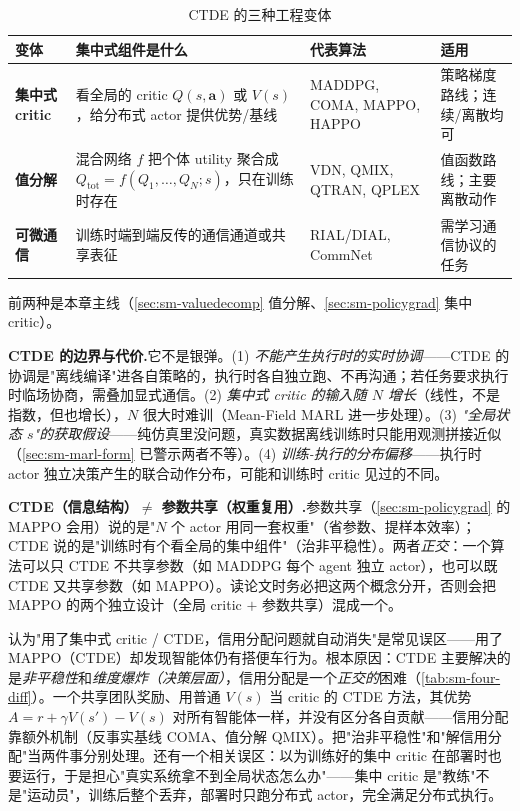 \begin{table}[H]\centering\small
\caption{CTDE 的三种工程变体}
\label{tab:sm-ctde-variants}
\begin{tabular}{p{} p{} p{} p{}}
\toprule
变体 & 集中式组件是什么 & 代表算法 & 适用 \\
\midrule
\textbf{集中式 critic} & 看全局的 critic $Q(s,\mathbf{a})$ 或 $V(s)$，给分布式 actor 提供优势/基线 & MADDPG, COMA, MAPPO, HAPPO & 策略梯度路线；连续/离散均可 \\
\textbf{值分解} & 混合网络 $f$ 把个体 utility 聚合成 $Q_{\text{tot}}=f(Q_1,\dots,Q_N;s)$，只在训练时存在 & VDN, QMIX, QTRAN, QPLEX & 值函数路线；主要离散动作 \\
\textbf{可微通信} & 训练时端到端反传的通信通道或共享表征 & RIAL/DIAL, CommNet & 需学习通信协议的任务 \\
\bottomrule
\end{tabular}
\end{table}

前两种是本章主线（\cref{sec:sm-valuedecomp} 值分解、\cref{sec:sm-policygrad} 集中 critic）。

\begin{note}
\textbf{CTDE 的边界与代价.}\;它不是银弹。(1) \emph{不能产生执行时的实时协调}——CTDE 的协调是"离线编译"进各自策略的，执行时各自独立跑、不再沟通；若任务要求执行时临场协商，需叠加显式通信。(2) \emph{集中式 critic 的输入随 $N$ 增长}（线性，不是指数，但也增长），$N$ 很大时难训（Mean-Field MARL 进一步处理）。(3) \emph{"全局状态 $s$"的获取假设}——纯仿真里没问题，真实数据离线训练时只能用观测拼接近似（\cref{sec:sm-marl-form} 已警示两者不等）。(4) \emph{训练-执行的分布偏移}——执行时 actor 独立决策产生的联合动作分布，可能和训练时 critic 见过的不同。
\end{note}

\begin{note}
\textbf{CTDE（信息结构）$\neq$ 参数共享（权重复用）.}\;参数共享（\cref{sec:sm-policygrad} 的 MAPPO 会用）说的是"$N$ 个 actor 用同一套权重"（省参数、提样本效率）；CTDE 说的是"训练时有个看全局的集中组件"（治非平稳性）。两者\emph{正交}：一个算法可以只 CTDE 不共享参数（如 MADDPG 每个 agent 独立 actor），也可以既 CTDE 又共享参数（如 MAPPO）。读论文时务必把这两个概念分开，否则会把 MAPPO 的两个独立设计（全局 critic $+$ 参数共享）混成一个。
\end{note}

\begin{pitfall}
认为"用了集中式 critic / CTDE，信用分配问题就自动消失"是常见误区——用了 MAPPO（CTDE）却发现智能体仍有搭便车行为。根本原因：CTDE 主要解决的是\emph{非平稳性}和\emph{维度爆炸（决策层面）}，信用分配是一个\emph{正交的}困难（\cref{tab:sm-four-diff}）。一个共享团队奖励、用普通 $V(s)$ 当 critic 的 CTDE 方法，其优势 $A=r+\gamma V(s')-V(s)$ 对所有智能体一样，并没有区分各自贡献——信用分配靠额外机制（反事实基线 COMA、值分解 QMIX）。把"治非平稳性"和"解信用分配"当两件事分别处理。还有一个相关误区：以为训练好的集中 critic 在部署时也要运行，于是担心"真实系统拿不到全局状态怎么办"——集中 critic 是"教练"不是"运动员"，训练后整个丢弃，部署时只跑分布式 actor，完全满足分布式执行。
\end{pitfall}

